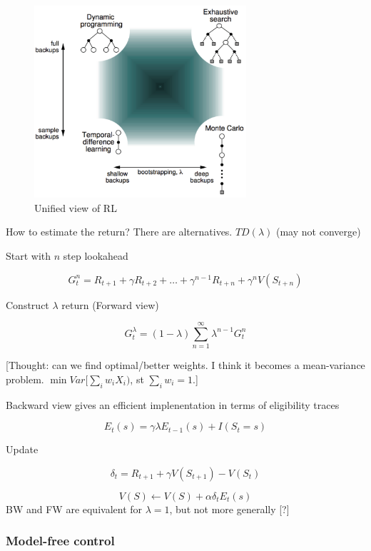 \documentclass[english]{article}
\begin{document}
    \begin{figure}
        \centering
\includegraphics[width=0.7\textwidth]{uni_rl.png}
\caption{Unified view of RL}
\label{Unified view of RL}
    \end{figure}

\item How to estimate the return? There are alternatives. $TD(\lambda)$ (may not converge)

Start with $n$ step lookahead 

$$G_t^n = R_{t+1}+\gamma R_{t+2} +\ldots + \gamma^{n-1} R_{t+n}
+\gamma^n V(S_{t+n})
$$

Construct $\lambda$ return (Forward view)

$$G_t^\lambda = (1-\lambda) \sum_{n=1}^\infty \lambda^{n-1} G_t^n
$$

[Thought: can we find optimal/better weights. I think it becomes a mean-variance problem. $\min Var[\sum_i w_i X_i)$, st $\sum_i w_i=1$.]

Backward view gives an efficient implenentation in terms of eligibility traces

$$E_t(s) = \gamma \lambda E_{t-1}(s)
+I(S_t=s)
$$

Update

$$\delta_t = R_{t+1}+\gamma V(S_{t+1}) - V(S_{t})
$$

$$V(S) \gets V(S)+\alpha \delta_t E_t(s)$$ 
BW and FW are equivalent for $\lambda=1$, but not more generally [?]



\eenum 


\subsubsection{Model-free control}
\benum
\end{document}
